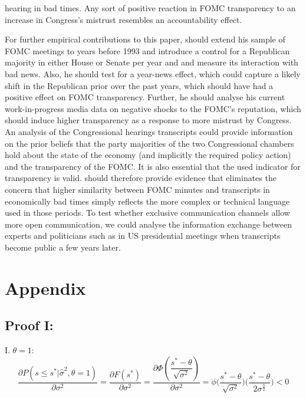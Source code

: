 \documentclass[paper=a4,12pt,DIV=11,twoside=false]{scrartcl}
\begin{document}
hearing in bad times. Any sort of positive reaction in FOMC transparency to an increase in Congress's mistrust resembles an accountability effect.

For further empirical contributions to this paper, \citet{GL2017} should extend his sample of FOMC meetings to years before 1993 and introduce a control for a Republican majority in either House or Senate per year and and measure its interaction with bad news. Also, he should test for a year-news effect, which could capture a likely shift in the Republican prior over the past years, which should have had a positive effect on FOMC transparency. Further, he should analyse his current work-in-progress media data on negative shocks to the FOMC's reputation, which should induce higher transparency as a response to more mistrust by Congress. An analysis of the Congressional hearings transcripts could provide information on the prior beliefs that the party majorities of the two Congressional chambers hold about the state of the economy (and implicitly the required policy action) and the transparency of the FOMC. It is also essential that the used indicator for transparency is valid. \citet{GL2017} should therefore provide evidence that eliminates the concern that higher similarity between FOMC minutes and transcripts in economically bad times simply reflects the more complex or technical language used in those periods. To test whether exclusive communication channels allow more open communication, we could analyse the information exchange between experts and politicians such as in US presidential meetings when transcripts become public a few years later.

\section{Appendix}

\subsection{Proof I:}

I. $\theta=1$:
\begin{equation}
\dfrac{\partial P(s \leq s^{*}|\hat{\sigma}^2,\theta=1)}{\partial \sigma^{2}} = \dfrac{\partial F(s^{*})}{\partial \sigma^2} = \dfrac{\partial \Phi(\dfrac{s^{*}-\theta}{\sqrt{\sigma^2}})}{\partial \sigma^2} = \phi\Big(\dfrac{s^{*}-\theta}{\sqrt{\sigma^2}}\Big)\Big(\dfrac{s^{*}-\theta}{2\sigma^{\frac{3}{2}}}\Big) < 0
\end{equation}
\end{document}
